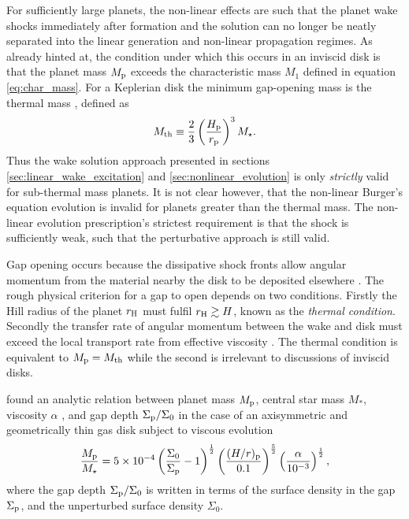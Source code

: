 For sufficiently large planets, the non-linear effects are such that the planet wake shocks immediately after formation and the solution can no longer be neatly separated into the linear generation and non-linear propagation regimes.
As already hinted at, the condition under which this occurs in an inviscid disk is that the planet mass $M_{\rm p}$ exceeds the characteristic mass $M_1$ defined in equation \ref{eq:char_mass}.
For a Keplerian disk the minimum gap-opening mass is the thermal mass \citep{lin1993}, defined as \citep{goodman2001}
\begin{align}
    M_{\rm th} \equiv \frac{2}{3} \left( \frac{H_{\rm p}}{r_{\rm p}}  \right)^3 M_\star. \label{eq:thermalmass}
\end{align}
Thus the wake solution approach presented in sections \ref{sec:linear_wake_excitation} and \ref{sec:nonlinear_evolution} is only \textit{strictly} valid for sub-thermal mass planets. It is not clear however, that the non-linear Burger's equation evolution is invalid for planets greater than the thermal mass. The non-linear evolution prescription's strictest requirement is that the shock is sufficiently weak, such that the perturbative approach is still valid.

Gap opening occurs because the dissipative shock fronts allow angular momentum from the material nearby the disk to be deposited elsewhere \citep{lin1979,goldreich1979,goldreich1980}.
The rough physical criterion for a gap to open depends on two conditions.
Firstly the Hill radius of the planet $r_{\rm H}$ \citep{hill1878} must fulfil $r_{\rm H} \gtrsim H$, known as the \textit{thermal condition}.
Secondly the transfer rate of angular momentum between the wake and disk must exceed the local transport rate from effective viscosity \citep{lin1993}.
The thermal condition is equivalent to $M_{\rm p} = M_{\rm th}$ while the second is irrelevant to discussions of inviscid disks.

\citet{kanagawa2015} found an analytic relation between planet mass $M_{\rm p}$, central star mass $M_*$, viscosity $\alpha$ \citep{shakura1973}, and gap depth $\Sigma_{\rm p} / \Sigma_0$ in the case of an axisymmetric and geometrically thin gas disk subject to viscous evolution
\begin{align}
    \frac{M_{\rm p}}{M_\star} = 5 \times 10^{-4} \left( \frac{\Sigma_0}{\Sigma_{\rm p}} - 1 \right)^{\frac{1}{2}} \left( \frac{(H/r)_{\rm p}}{0.1}  \right)^{\frac{5}{2}} \left( \frac{\alpha}{10^{-3}} \right)^{\frac{1}{2}}, \label{eq:kanagawa_gap_depth}
\end{align}
where the gap depth $\Sigma_{\rm p} / \Sigma_0$ is written in terms of the surface density in the gap $\Sigma_{\rm p}$, and the unperturbed surface density $\Sigma_0$.

